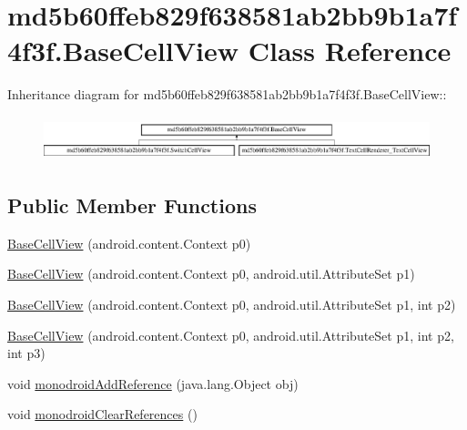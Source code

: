 \hypertarget{classmd5b60ffeb829f638581ab2bb9b1a7f4f3f_1_1_base_cell_view}{
\section{md5b60ffeb829f638581ab2bb9b1a7f4f3f.BaseCellView Class Reference}
\label{classmd5b60ffeb829f638581ab2bb9b1a7f4f3f_1_1_base_cell_view}
}
Inheritance diagram for md5b60ffeb829f638581ab2bb9b1a7f4f3f.BaseCellView::\begin{figure}[H]
\begin{center}
\leavevmode
\includegraphics[height=1.2993cm]{classmd5b60ffeb829f638581ab2bb9b1a7f4f3f_1_1_base_cell_view}
\end{center}
\end{figure}
\subsection*{Public Member Functions}
\begin{CompactItemize}
\item 
\hyperlink{classmd5b60ffeb829f638581ab2bb9b1a7f4f3f_1_1_base_cell_view_7bbdf44f1151ae9c2fbf5be34398aba5}{BaseCellView} (android.content.Context p0)
\item 
\hyperlink{classmd5b60ffeb829f638581ab2bb9b1a7f4f3f_1_1_base_cell_view_8c64775ade9cdc20316e9b64a710eb0f}{BaseCellView} (android.content.Context p0, android.util.AttributeSet p1)
\item 
\hyperlink{classmd5b60ffeb829f638581ab2bb9b1a7f4f3f_1_1_base_cell_view_fad241accb4e748807ae00d69c3fc2c3}{BaseCellView} (android.content.Context p0, android.util.AttributeSet p1, int p2)
\item 
\hyperlink{classmd5b60ffeb829f638581ab2bb9b1a7f4f3f_1_1_base_cell_view_0b1897543fcf568d3917ac5b35f7806b}{BaseCellView} (android.content.Context p0, android.util.AttributeSet p1, int p2, int p3)
\item 
void \hyperlink{classmd5b60ffeb829f638581ab2bb9b1a7f4f3f_1_1_base_cell_view_7064411ae8713f07abf9855828ab5d7a}{monodroidAddReference} (java.lang.Object obj)
\item 
void \hyperlink{classmd5b60ffeb829f638581ab2bb9b1a7f4f3f_1_1_base_cell_view_bd00d7bfaf56776cb2df98366ee775d7}{monodroidClearReferences} ()
\end{CompactItemize}
